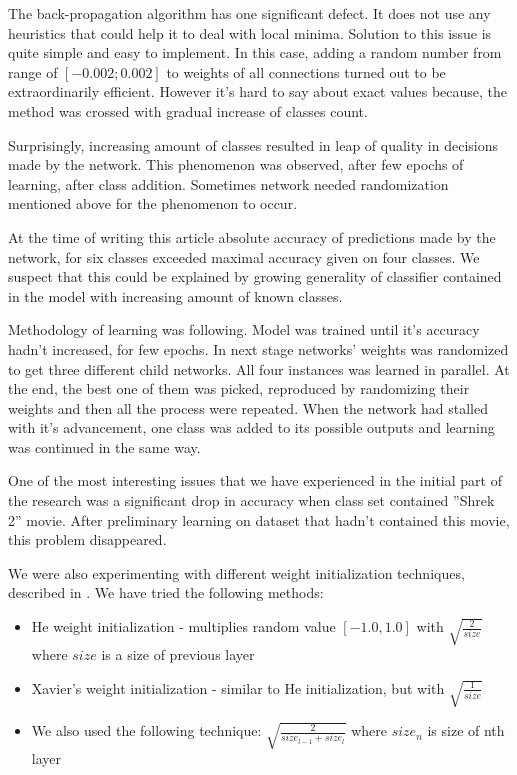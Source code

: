 \documentclass[conference]{IEEEtran}
\begin{document}
	The back-propagation algorithm has one significant defect. It does not use any heuristics that could help it to deal with local minima. Solution to this issue is quite simple and easy to implement. In this case, adding a random number from range of $[-0.002;0.002]$ to weights of all connections turned out to be extraordinarily efficient. However it's hard to say about exact values because, the method was crossed with gradual increase of classes count.
	
	Surprisingly, increasing amount of classes resulted in leap of quality in decisions made by the network. This phenomenon was observed, after few epochs of learning, after class addition. Sometimes network needed randomization mentioned above for the phenomenon to occur.
	
	At the time of writing this article absolute accuracy of predictions made by the network, for six classes exceeded maximal accuracy given on four classes. We suspect that this could be explained by growing generality of classifier contained in the model with increasing amount of known classes.
        
    Methodology of learning was following. Model was trained until it's accuracy hadn't increased, for few epochs. In next stage networks' weights was randomized to get three different child networks. All four instances was learned in parallel. At the end, the best one of them was picked, reproduced by randomizing their weights and then all the process were repeated. When the network had stalled with it's advancement, one class was added to its possible outputs and learning was continued in the same way.
    
    One of the most interesting issues that we have experienced in the initial part of the research was a significant drop in accuracy when class set contained ''Shrek 2'' movie. After preliminary learning on dataset that hadn't contained this movie, this problem disappeared.
    
    We were also experimenting with different weight initialization techniques, described in \cite{WeightInit}. We have tried the following methods:
    \begin{itemize}
        \item He weight initialization - multiplies random value $[-1.0, 1.0]$ with $\sqrt{\frac{2}{size}}$ where $size$ is a size of previous layer
        \item Xavier's weight initialization - similar to He initialization, but with $\sqrt{\frac{1}{size}}$
        \item We also used the following technique: $\sqrt{\frac{2}{size_{l-1} + size_{l}}}$ where $size_n$ is size of nth layer
    \end{itemize}
    
\end{document}
